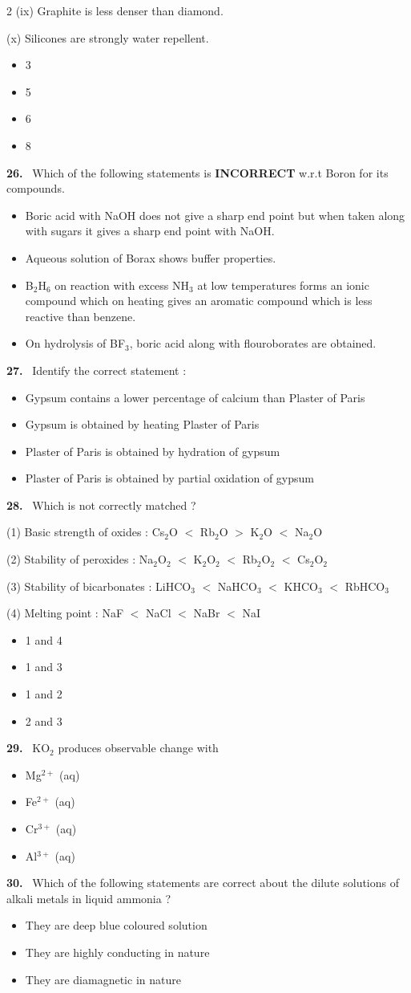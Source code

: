 \documentclass[10pt]{extarticle}
\newcommand{\qn}[1]{\par\smallskip\noindent\textbf{#1.}~}
\newenvironment{qoptions}{\begin{itemize}[leftmargin=1.8em,itemsep=1pt,topsep=2pt,label={}]}{\end{itemize}}
\newcommand{\opt}[2]{\item[(#1)] #2}
\begin{document}
\begin{multicols}{2}
(ix) Graphite is less denser than diamond.\par
(x) Silicones are strongly water repellent.
\begin{qoptions}
\opt{A}{3}
\opt{B}{5}
\opt{C}{6}
\opt{D}{8}
\end{qoptions}
\qn{26} Which of the following statements is \textbf{INCORRECT} w.r.t Boron for its compounds.
\begin{qoptions}
\opt{A}{Boric acid with NaOH does not give a sharp end point but when taken along with sugars it gives a sharp end point with NaOH.}
\opt{B}{Aqueous solution of Borax shows buffer properties.}
\opt{C}{B$_2$H$_6$ on reaction with excess NH$_3$ at low temperatures forms an ionic compound which on heating gives an aromatic compound which is less reactive than benzene.}
\opt{D}{On hydrolysis of BF$_3$, boric acid along with flouroborates are obtained.}
\end{qoptions}
\qn{27} Identify the correct statement :
\begin{qoptions}
\opt{A}{Gypsum contains a lower percentage of calcium than Plaster of Paris}
\opt{B}{Gypsum is obtained by heating Plaster of Paris}
\opt{C}{Plaster of Paris is obtained by hydration of gypsum}
\opt{D}{Plaster of Paris is obtained by partial oxidation of gypsum}
\end{qoptions}
\qn{28} Which is not correctly matched ?\par
(1) Basic strength of oxides : Cs$_2$O $<$ Rb$_2$O $>$ K$_2$O $<$ Na$_2$O\par
(2) Stability of peroxides : Na$_2$O$_2$ $<$ K$_2$O$_2$ $<$ Rb$_2$O$_2$ $<$ Cs$_2$O$_2$\par
(3) Stability of bicarbonates : LiHCO$_3$ $<$ NaHCO$_3$ $<$ KHCO$_3$ $<$ RbHCO$_3$\par
(4) Melting point : NaF $<$ NaCl $<$ NaBr $<$ NaI
\begin{qoptions}
\opt{A}{1 and 4}
\opt{B}{1 and 3}
\opt{C}{1 and 2}
\opt{D}{2 and 3}
\end{qoptions}
\qn{29} KO$_2$ produces observable change with
\begin{qoptions}
\opt{A}{Mg$^{2+}$ (aq)}
\opt{B}{Fe$^{2+}$ (aq)}
\opt{C}{Cr$^{3+}$ (aq)}
\opt{D}{Al$^{3+}$ (aq)}
\end{qoptions}
\qn{30} Which of the following statements are correct about the dilute solutions of alkali metals in liquid ammonia ?
\begin{qoptions}
\opt{A}{They are deep blue coloured solution}
\opt{B}{They are highly conducting in nature}
\opt{C}{They are diamagnetic in nature}

\end{qoptions}
\end{multicols}
\end{document}
